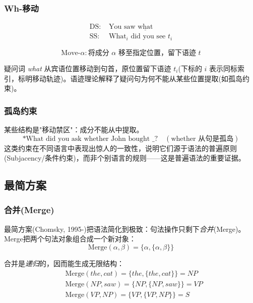 \subsubsection{Wh-移动}

\begin{align}
    \text{DS: } & \text{You saw } \underline{\text{what}} \\
    \text{SS: } & \text{What}_i \text{ did you see } t_i
\end{align}

\begin{equation}
    \text{Move-}\alpha: \text{将成分 } \alpha \text{ 移至指定位置，留下语迹 } t
\end{equation}

疑问词 \emph{what} 从宾语位置移动到句首，原位置留下语迹 $t_i$(下标的 $i$ 表示同标索引，标明移动轨迹)。语迹理论解释了疑问句为何不能从某些位置提取(如孤岛约束)。

\subsubsection{孤岛约束}

某些结构是"移动禁区"：成分不能从中提取。
\begin{equation}
    \text{*What did you ask whether John bought \_ ?} \quad (\text{whether 从句是孤岛})
\end{equation}
这类约束在不同语言中表现出惊人的一致性，说明它们源于语法的普遍原则(Subjacency/条件约束)，而非个别语言的规则——这是普遍语法的重要证据。

\subsection{最简方案}

\subsubsection{合并(Merge)}

最简方案(Chomsky, 1995-)把语法简化到极致：句法操作只剩下\emph{合并}(Merge)。Merge把两个句法对象组合成一个新对象：
\begin{equation}
    \text{Merge}(\alpha, \beta) = \{\alpha, \{\alpha, \beta\}\}
\end{equation}

合并是\emph{递归}的，因而能生成无限结构：
\begin{equation}
    \begin{aligned}
    &\text{Merge}(the, cat) = \{the, \{the, cat\}\} = NP \\
    &\text{Merge}(NP, saw) = \{NP, \{NP, saw\}\} = VP \\
    &\text{Merge}(VP, NP) = \{VP, \{VP, NP\}\} = S
    \end{aligned}
\end{equation}


